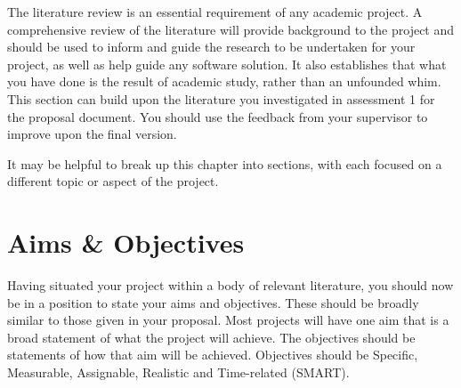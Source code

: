 The literature review is an essential requirement of any academic project. A comprehensive review of the literature will provide background to the project and should be used to inform and guide the research to be undertaken for your project, as well as help guide any software solution. It also establishes that what you have done is the result of academic study, rather than an unfounded whim. This section can build upon the literature you investigated in assessment 1 for the proposal document. You should use the feedback from your supervisor to improve upon the final version. 

It may be helpful to break up this chapter into sections, with each focused on a different topic or aspect of the project.


\section{Aims \& Objectives}
Having situated your project within a body of relevant literature, you should now be in a position to state your aims and objectives. These should be broadly similar to those given in your proposal. Most projects will have one aim that is a broad statement of what the project will achieve. The objectives should be statements of how that aim will be achieved. Objectives should be Specific, Measurable, Assignable, Realistic and Time-related (SMART).
